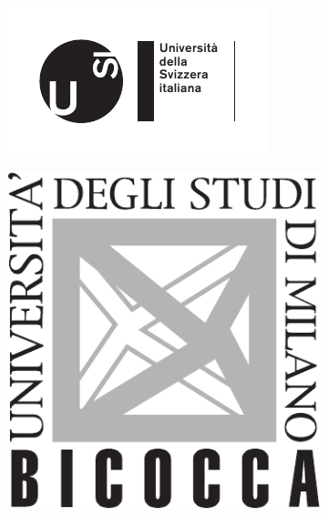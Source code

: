 \pagestyle{cover}
		\begin{center}
			
			\begin{figure}
				\begin{subfigure}[h]{0.18\textwidth}
					\includegraphics[width=\textwidth]{logo-usi}
				\end{subfigure}
				\hfill
				\begin{subfigure}[h]{0.15\textwidth}
					\includegraphics[width=\textwidth]{logo-bicocca}
				\end{subfigure}
			\vspace{10mm}
			\end{figure}
		

\end{center}
